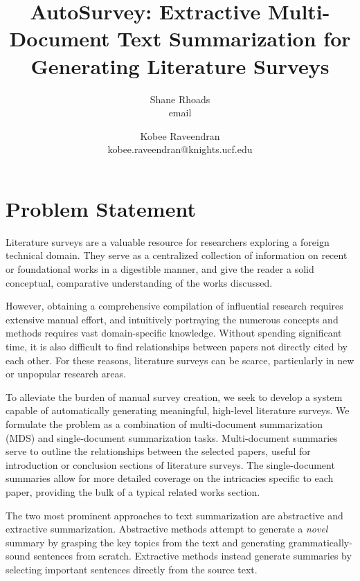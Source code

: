 \documentclass[conference]{sig-alternate-05-2015}
\begin{document}
\title{AutoSurvey: Extractive Multi-Document Text Summarization for Generating Literature Surveys}


\author{Shane Rhoads\\ email \and Kobee Raveendran  \\ kobee.raveendran@knights.ucf.edu}

\maketitle

\section{Problem Statement}

Literature surveys are a valuable resource for researchers exploring a foreign technical domain. They serve as a 
centralized collection of information on recent or foundational works in a digestible manner, and give the reader 
a solid conceptual, comparative understanding of the works discussed. 

However, obtaining a comprehensive compilation of influential research requires extensive manual effort, and intuitively 
portraying the numerous concepts and methods requires vast domain-specific knowledge. Without spending significant 
time, it is also difficult to find relationships between papers not directly cited by each other. For these reasons, literature 
surveys can be scarce, particularly in new or unpopular research areas.

To alleviate the burden of manual survey creation, we seek to develop a system capable of automatically generating meaningful, 
high-level literature surveys. We formulate the problem as a combination of multi-document summarization (MDS) and 
single-document summarization tasks. Multi-document summaries serve to outline the relationships between the selected papers, 
useful for introduction or conclusion sections of literature surveys. The single-document summaries allow for more detailed 
coverage on the intricacies specific to each paper, providing the bulk of a typical related works section.

The two most prominent approaches to text summarization are abstractive and extractive summarization. Abstractive methods attempt to generate a 
\textit{novel} summary by grasping the key topics from the text and generating grammatically-sound sentences from scratch. 
Extractive methods instead generate summaries by selecting important sentences directly from the source text. 
\end{document}
